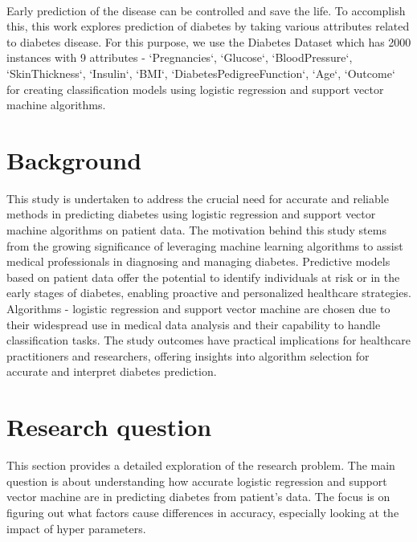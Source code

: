 ~\\[0cm]
Early prediction of the disease can be controlled and save the life. To accomplish this, this work explores prediction of diabetes by taking various attributes related to diabetes disease. For this purpose, we use the Diabetes Dataset \cite{dataset} which has 2000 instances with 9 attributes - `Pregnancies`, `Glucose`, `BloodPressure`, `SkinThickness`, `Insulin`, `BMI`, `DiabetesPedigreeFunction`, `Age`, `Outcome` for creating classification models using logistic regression and support vector machine algorithms.



\section{Background}
\label{sec:into_back}
This study is undertaken to address the crucial need for accurate and reliable methods in predicting diabetes using logistic regression and support vector machine algorithms on patient data. The motivation behind this study stems from the growing significance of leveraging machine learning algorithms to assist medical professionals in diagnosing and managing diabetes. Predictive models based on patient data offer the potential to identify individuals at risk or in the early stages of diabetes, enabling proactive and personalized healthcare strategies. Algorithms - logistic regression and support vector machine are chosen due to their widespread use in medical data analysis and their capability to handle classification tasks. The study outcomes have practical implications for healthcare practitioners and researchers, offering insights into algorithm selection for accurate and interpret diabetes prediction.

\section{Research question}
\label{sec:intro_prob_art}
This section provides a detailed exploration of the research problem. The main question is about understanding how accurate logistic regression and support vector machine are in predicting diabetes from patient's data. The focus is on figuring out what factors cause differences in accuracy, especially looking at the impact of hyper parameters.

